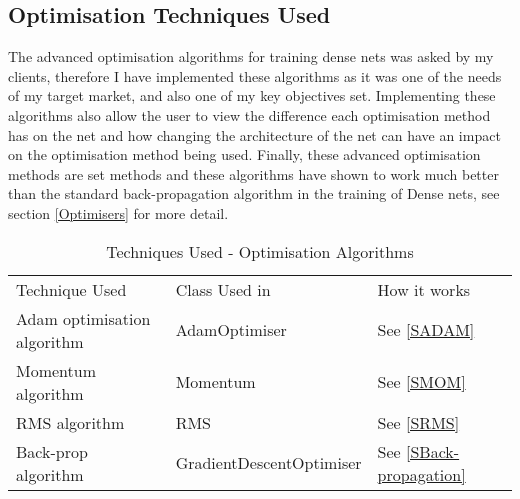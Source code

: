 \subsection{Optimisation Techniques Used}
The advanced optimisation algorithms for training dense nets was asked by my clients, therefore I have implemented these algorithms as it was one of the needs of my target market, and also one of my key objectives set. Implementing these algorithms also allow the user to view the difference each optimisation method has on the net and how changing the architecture of the net can have an impact on the optimisation method being used. Finally, these advanced optimisation methods are set methods and these algorithms have shown to work much better than the standard back-propagation algorithm in the training of Dense nets, see section \ref{Optimisers} for more detail.

\begin{table}[H]
\centering
    \begin{tabular}{|p{5.5cm}|p{4cm}|p{4cm}|}
    \hline
    Technique Used & Class Used in & How it works \\ \cline{1-3}
    
    Adam optimisation algorithm & AdamOptimiser & See \ref{SADAM} \\ \cline{1-3}
    
    Momentum algorithm & Momentum & See \ref{SMOM} \\ \cline{1-3}
    
    RMS algorithm & RMS & See \ref{SRMS} \\ \cline{1-3}
    
    Back-prop algorithm & GradientDescentOptimiser & See \ref{SBack-propagation} \\ \cline{1-3}
    \end{tabular}
    \caption{Techniques Used - Optimisation Algorithms}
\end{table}

